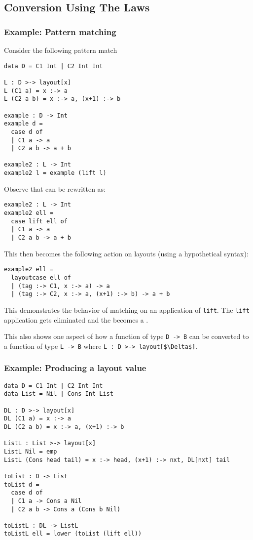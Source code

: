 \documentclass[10pt]{article}
\begin{document}
\subsection{Conversion Using The Laws}

\subsubsection{Example: Pattern matching}
Consider the following pattern match

\begin{lstlisting}
data D = C1 Int | C2 Int Int

L : D >-> layout[x]
L (C1 a) = x :-> a
L (C2 a b) = x :-> a, (x+1) :-> b

example : D -> Int
example d =
  case d of
  | C1 a -> a
  | C2 a b -> a + b

example2 : L -> Int
example2 l = example (lift l)
\end{lstlisting}

\noindent
Observe that  can be rewritten as:

\begin{lstlisting}
example2 : L -> Int
example2 ell =
  case lift ell of
  | C1 a -> a
  | C2 a b -> a + b
\end{lstlisting}

\noindent
This then becomes the following action on layouts (using a hypothetical syntax):

\begin{lstlisting}
example2 ell =
  layoutcase ell of 
  | (tag :-> C1, x :-> a) -> a
  | (tag :-> C2, x :-> a, (x+1) :-> b) -> a + b
\end{lstlisting}

\noindent
This demonstrates the behavior of  matching on an application of \lstinline{lift}. The \lstinline{lift} application
gets eliminated and the  becomes a .

This also shows one aspect of how a function of type \lstinline{D -> B} can be converted to a function of type
\lstinline{L -> B} where \lstinline{L : D >-> layout[$\Delta$]}.

\subsubsection{Example: Producing a layout value}

\begin{lstlisting}
data D = C1 Int | C2 Int Int
data List = Nil | Cons Int List

DL : D >-> layout[x]
DL (C1 a) = x :-> a
DL (C2 a b) = x :-> a, (x+1) :-> b

ListL : List >-> layout[x]
ListL Nil = emp
ListL (Cons head tail) = x :-> head, (x+1) :-> nxt, DL[nxt] tail

toList : D -> List
toList d =
  case d of
  | C1 a -> Cons a Nil
  | C2 a b -> Cons a (Cons b Nil)

toListL : DL -> ListL
toListL ell = lower (toList (lift ell))
\end{lstlisting}
\end{document}
